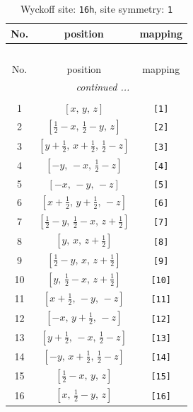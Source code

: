 \documentclass[fleqn,8pt]{jsarticle}
\begin{document}
\begin{longtable}{ccc}
\caption{Wyckoff site: {\tt 16h}, site symmetry: {\tt 1}}
 \\
 \hline \hline
No. & position & mapping \\ \hline \endfirsthead

\multicolumn{2}{l}{\tablename\ \thetable{}} \\
 \hline \hline
No. & position & mapping \\ \hline \endhead

 \hline \hline
\multicolumn{2}{r}{\footnotesize\it continued ...} \\ \endfoot

 \hline \hline
\multicolumn{2}{r}{} \\ \endlastfoot

1 & $\left[ x,\, y,\, z \right]$ & {\tt [1]} \\ \hline
2 & $\left[ \frac{1}{2} - x,\, \frac{1}{2} - y,\, z \right]$ & {\tt [2]} \\ \hline
3 & $\left[ y + \frac{1}{2},\, x + \frac{1}{2},\, \frac{1}{2} - z \right]$ & {\tt [3]} \\ \hline
4 & $\left[ - y,\, - x,\, \frac{1}{2} - z \right]$ & {\tt [4]} \\ \hline
5 & $\left[ - x,\, - y,\, - z \right]$ & {\tt [5]} \\ \hline
6 & $\left[ x + \frac{1}{2},\, y + \frac{1}{2},\, - z \right]$ & {\tt [6]} \\ \hline
7 & $\left[ \frac{1}{2} - y,\, \frac{1}{2} - x,\, z + \frac{1}{2} \right]$ & {\tt [7]} \\ \hline
8 & $\left[ y,\, x,\, z + \frac{1}{2} \right]$ & {\tt [8]} \\ \hline
9 & $\left[ \frac{1}{2} - y,\, x,\, z + \frac{1}{2} \right]$ & {\tt [9]} \\ \hline
10 & $\left[ y,\, \frac{1}{2} - x,\, z + \frac{1}{2} \right]$ & {\tt [10]} \\ \hline
11 & $\left[ x + \frac{1}{2},\, - y,\, - z \right]$ & {\tt [11]} \\ \hline
12 & $\left[ - x,\, y + \frac{1}{2},\, - z \right]$ & {\tt [12]} \\ \hline
13 & $\left[ y + \frac{1}{2},\, - x,\, \frac{1}{2} - z \right]$ & {\tt [13]} \\ \hline
14 & $\left[ - y,\, x + \frac{1}{2},\, \frac{1}{2} - z \right]$ & {\tt [14]} \\ \hline
15 & $\left[ \frac{1}{2} - x,\, y,\, z \right]$ & {\tt [15]} \\ \hline
16 & $\left[ x,\, \frac{1}{2} - y,\, z \right]$ & {\tt [16]} \\
\end{longtable}
\end{document}

